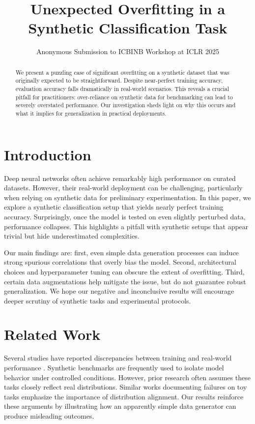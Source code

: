 \documentclass[11pt]{article}
\title{Unexpected Overfitting in a Synthetic Classification Task}
\author{Anonymous Submission to ICBINB Workshop at ICLR 2025}
\date{}
\begin{document}
\maketitle

\begin{abstract}
We present a puzzling case of significant overfitting on a synthetic dataset that was originally expected to be straightforward. Despite near-perfect training accuracy, evaluation accuracy falls dramatically in real-world scenarios. This reveals a crucial pitfall for practitioners: over-reliance on synthetic data for benchmarking can lead to severely overstated performance. Our investigation sheds light on why this occurs and what it implies for generalization in practical deployments.
\end{abstract}

\section{Introduction}
Deep neural networks often achieve remarkably high performance on curated datasets. However, their real-world deployment can be challenging, particularly when relying on synthetic data for preliminary experimentation. In this paper, we explore a synthetic classification setup that yields nearly perfect training accuracy. Surprisingly, once the model is tested on even slightly perturbed data, performance collapses. This highlights a pitfall with synthetic setups that appear trivial but hide underestimated complexities.

Our main findings are: first, even simple data generation processes can induce strong spurious correlations that overly bias the model. Second, architectural choices and hyperparameter tuning can obscure the extent of overfitting. Third, certain data augmentations help mitigate the issue, but do not guarantee robust generalization. We hope our negative and inconclusive results will encourage deeper scrutiny of synthetic tasks and experimental protocols.

\section{Related Work}
Several studies have reported discrepancies between training and real-world performance \cite{krizhevsky2012,he2016}. Synthetic benchmarks are frequently used to isolate model behavior under controlled conditions. However, prior research often assumes these tasks closely reflect real distributions. Similar works documenting failures on toy tasks emphasize the importance of distribution alignment. Our results reinforce these arguments by illustrating how an apparently simple data generator can produce misleading outcomes.
\end{document}

